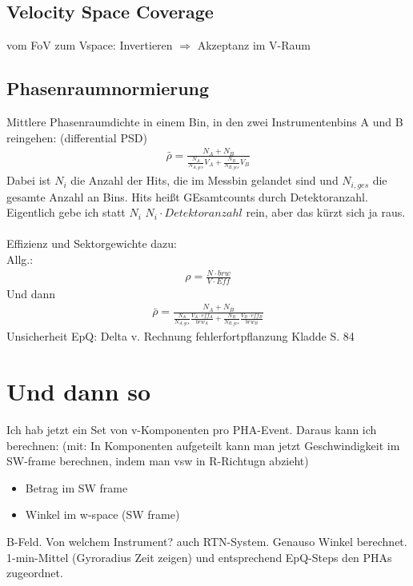 \subsection{Velocity Space Coverage}
vom FoV zum Vspace: Invertieren $\Rightarrow$ Akzeptanz im V-Raum

%
\subsection{Phasenraumnormierung}
Mittlere Phasenraumdichte in einem Bin, in den zwei Instrumentenbins A und B reingehen:
(differential PSD)
\begin{align}
\bar{\rho} = \frac{N_A + N_B}{\frac{N_A}{N_{A,ges}} V_A + \frac{N_B}{N_{B,ges}} V_B }
\end{align}
Dabei ist $N_i$ die Anzahl der Hits, die im Messbin gelandet sind und $N_{i,ges}$ die gesamte Anzahl an Bins. Hits heißt GEsamtcounts durch Detektoranzahl. Eigentlich gebe ich statt $N_i$ $N_i \cdot Detektoranzahl$ rein, aber das kürzt sich ja raus.\\ \\
Effizienz und Sektorgewichte dazu:\\
Allg.:
\begin{align*}
\rho = \frac{N \cdot brw}{V \cdot Eff}
\end{align*}
Und dann
\begin{align}
\bar{\rho} = \frac{N_A + N_B}{\frac{N_A}{N_{A,ges}} \frac{V_A \cdot eff_A}{brw_A} + \frac{N_B}{N_{B,ges}} \frac{V_B \cdot eff_B}{brw_B} }
\end{align}
Unsicherheit EpQ: Delta v. Rechnung fehlerfortpflanzung Kladde S. 84


%
%
%
\section{Und dann so}
Ich hab jetzt ein Set von v-Komponenten pro PHA-Event. Daraus kann ich berechnen:
(mit: In Komponenten aufgeteilt kann man jetzt Geschwindigkeit im SW-frame berechnen, indem man vsw in R-Richtugn abzieht)
\begin{itemize}
	\item Betrag im SW frame
	\item Winkel im w-space (SW frame)
\end{itemize}
B-Feld. Von welchem Instrument? auch RTN-System. Genauso Winkel berechnet.\\
1-min-Mittel (Gyroradius Zeit zeigen) und entsprechend EpQ-Steps den PHAs zugeordnet.


